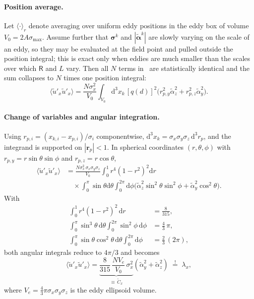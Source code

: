 \documentclass[
 amsmath,amssymb,
 aps,
 twocolumn,
]{revtex4-2}
\renewcommand{\vec}[1]{\boldsymbol{#1}}
\newcommand{\dd}{\mathrm{d}}
\newcommand{\bR}{\mathsf{R}}
\begin{document}
\paragraph*{Position average.}
Let $\langle\cdot\rangle_r$ denote averaging over uniform eddy positions
in the eddy box of volume $V_0=2A\sigma_{\max}$. Assume further that
$\vec\sigma^k$ and $|\tilde{\vec\alpha}^k|$ are slowly varying on the
scale of an eddy, so they may be evaluated at the field point and
pulled outside the position integral; this is exact only when eddies are
much smaller than the scales over which $\bR$ and $L$ vary. Then all
$N$ terms in~ are statistically identical and
the sum collapses to $N$ times one position integral:
\begin{equation}\label{eq:app_after_pos}
  \langle\tilde u'_x\tilde u'_x\rangle
  = \frac{N\sigma_x^2}{V_0}\!\int_{V_0}\!\dd^3 x_k\,
    [q(d)]^2
    \bigl(r_{p,y}^2\tilde\alpha_z^2 + r_{p,z}^2\tilde\alpha_y^2\bigr).
\end{equation}

\paragraph*{Change of variables and angular integration.}
Using $r_{p,i}=(x_{k,i}-x_{p,i})/\sigma_i$ componentwise,
$\dd^3 x_k = \sigma_x\sigma_y\sigma_z\,\dd^3 r_p$, and the integrand is
supported on $|\vec r_p|<1$. In spherical coordinates $(r,\theta,\phi)$ with
$r_{p,y}=r\sin\theta\sin\phi$ and $r_{p,z}=r\cos\theta$,
\begin{equation}\label{eq:app_polar}
\begin{aligned}
  \langle\tilde u'_x\tilde u'_x\rangle
  &= \frac{N\sigma_x^2\,\sigma_x\sigma_y\sigma_z}{V_0}
     \!\int_0^1\!r^4(1-r^2)^2\dd r\\
  &\quad\times\!\int_0^\pi\!\sin\theta\dd\theta\!\int_0^{2\pi}\!\dd\phi
       \bigl(\tilde\alpha_z^2\sin^2\theta\sin^2\phi
            + \tilde\alpha_y^2\cos^2\theta\bigr).
\end{aligned}
\end{equation}
With
\begin{align}
  \int_0^1\!r^4(1-r^2)^2\,\dd r &= \tfrac{8}{315}, \label{eq:app_int_radial}\\
  \int_0^\pi\!\sin^3\theta\,\dd\theta\!\int_0^{2\pi}\!\sin^2\phi\,\dd\phi
    &= \tfrac{4}{3}\,\pi, \label{eq:app_int_ang1}\\
  \int_0^\pi\!\sin\theta\cos^2\theta\,\dd\theta\!\int_0^{2\pi}\!\dd\phi
    &= \tfrac{2}{3}\,(2\pi), \label{eq:app_int_ang2}
\end{align}
both angular integrals reduce to $4\pi/3$ and 
becomes
\begin{equation}\label{eq:app_match}
  \langle\tilde u'_x\tilde u'_x\rangle
   = \underbrace{\frac{8}{315}\,\frac{N V_e}{V_0}\,\sigma_x^2}_{\displaystyle\equiv\, \tilde C_x}
    (\tilde\alpha_y^2+\tilde\alpha_z^2) \;\stackrel{!}{=}\; \lambda_x,
\end{equation}
where $V_e=\tfrac{4}{3}\pi\sigma_x\sigma_y\sigma_z$ is the eddy
ellipsoid volume.
\end{document}
